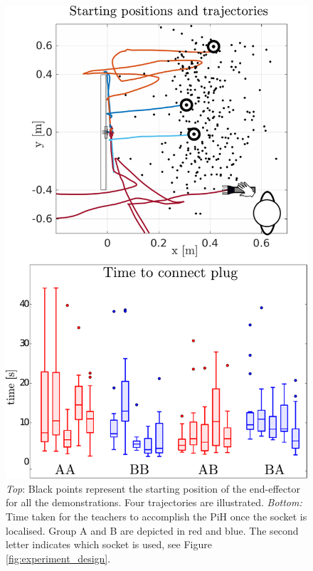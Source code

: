 \begin{figure}
 \centering
   \includegraphics[width=\textwidth]{./ch4-PiH/Figures/Fig/start_position_v2.pdf}
   \caption{\textit{Top}: Black points represent the starting position of the end-effector
   for all the demonstrations. Four trajectories are illustrated. \textit{Bottom:} 
   Time taken for the teachers to accomplish the PiH once the socket is localised. Group A and B are depicted in red 
   and blue. The second letter indicates which socket is used, see Figure \ref{fig:experiment_design}.}
   
  \label{fig:experiment_setup_data}
\end{figure}

